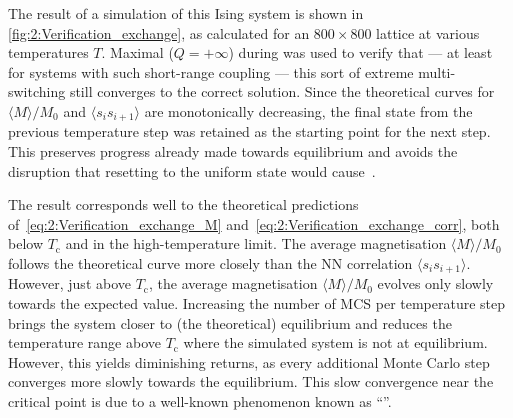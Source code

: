 The result of a \hotspice simulation of this Ising system is shown in \cref{fig:2:Verification_exchange}, as calculated for an $800 \times 800$ lattice at various temperatures $T$.
Maximal  ($Q=+\infty$) during  was used to verify that --- at least for systems with such short-range coupling --- this sort of extreme multi-switching still converges to the correct solution.
Since the theoretical curves for $\langle M \rangle / M_0$ and $\langle s_i s_{i+1} \rangle$ are monotonically decreasing, the final state from the previous temperature step was retained as the starting point for the next step.
This preserves progress already made towards equilibrium and avoids the disruption that resetting to the uniform state would cause~\cite{MCinStatPhys}. \par
The \hotspice result corresponds well to the theoretical predictions of~\cref{eq:2:Verification_exchange_M} and~\cref{eq:2:Verification_exchange_corr}, both below $T_\mathrm{c}$ and in the high-temperature limit.
The average magnetisation $\langle M \rangle / M_0$ follows the theoretical curve more closely than the NN correlation $\langle s_i s_{i+1} \rangle$.
However, just above $T_\mathrm{c}$, the average magnetisation $\langle M \rangle / M_0$ evolves only slowly towards the expected value.
Increasing the number of MCS per temperature step brings the system closer to (the theoretical) equilibrium and reduces the temperature range above $T_\mathrm{c}$ where the simulated system is not at equilibrium.
However, this yields diminishing returns, as every additional Monte Carlo step converges more slowly towards the equilibrium.
This slow convergence near the critical point is due to a well-known phenomenon known as ``''.



